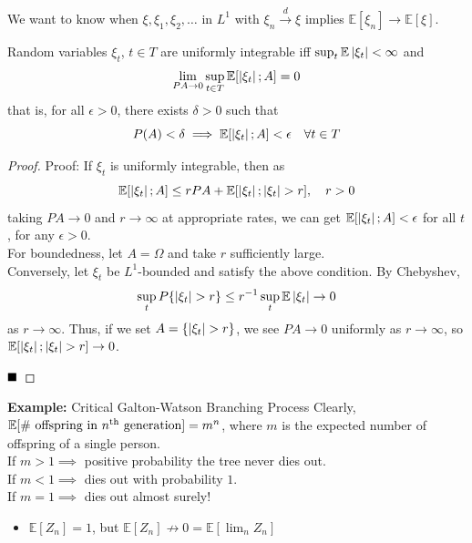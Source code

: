 
We want to know when $\xi, \xi_1, \xi_2, \ldots$ in $L^1$ with $\xi_n \xrightarrow{d} \xi$ implies $\mathbb{E}[\xi_n] \to \mathbb{E}[\xi]$.

\begin{lemma}
    Random variables $\xi_t$, $t \in T$ are uniformly integrable iff $\sup_t \mathbb{E}\abs{\xi_t} < \infty$ and
    \[ \lim_{PA \to 0} \sup_{t \in T} \mathbb{E}[\abs{\xi_t} ; A] = 0 \]
    that is, for all $\epsilon > 0$, there exists $\delta > 0$ such that
    \[ P(A) < \delta \implies \mathbb{E}[\abs{\xi_t} ; A] < \epsilon \quad \forall t \in T \]
\end{lemma}
\begin{proof}{Proof:}
    If $\xi_t$ is uniformly integrable, then as
    \[ \mathbb{E}[\abs{\xi_t} ; A] \leq rPA + \mathbb{E}[\abs{\xi_t} ; \abs{\xi_t} > r], \quad r > 0 \]
    taking $PA \to 0$ and $r \to \infty$ at appropriate rates, we can get $\mathbb{E}[\abs{\xi_t} ; A] < \epsilon$ for all $t$, for any $\epsilon > 0$.\\

    For boundedness, let $A = \Omega$ and take $r$ sufficiently large.\\

    Conversely, let $\xi_t$ be $L^1$-bounded and satisfy the above condition. By Chebyshev,
    \[ \sup_{t} P\{\abs{\xi_t} > r\} \leq r^{-1}\sup_{t} \mathbb{E}\abs{\xi_t} \to 0 \]
    as $r \to \infty$. Thus, if we set $A = \{\abs{\xi_t} > r\}$, we see $PA \to 0$ uniformly as $r \to \infty$, so $\mathbb{E}[\abs{\xi_t} ; \abs{\xi_t} > r] \to 0$.

    $\qed$
\end{proof}

\begin{example}{\textbf{Example:} Critical Galton-Watson Branching Process}
    Clearly, $\mathbb{E}[\#\tt{ offspring in } n^{\tt{th}} \tt{ generation}] = m^{n}$, where $m$ is the expected number of offspring of a single person.\\

    If $m > 1 \implies$ positive probability the tree never dies out.\\

    If $m < 1 \implies$ dies out with probability $1$.\\

    If $m = 1 \implies$ dies out almost surely!
    \begin{itemize}
        \item $\mathbb{E}[Z_n] = 1$, but $\mathbb{E}[Z_n] \not\to 0 = \mathbb{E}[\lim_{n} Z_n]$
    \end{itemize}
\end{example}

